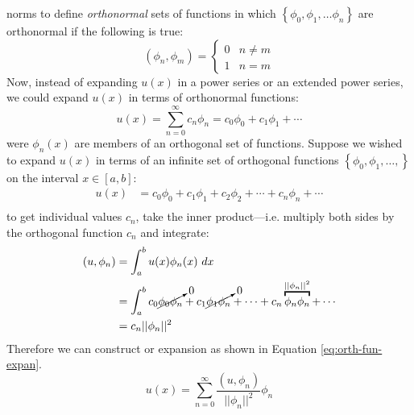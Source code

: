  norms to define \emph{orthonormal} sets of functions in which $\left\{ \phi_0, \phi_1, \dots \phi_n\right\}$ are orthonormal if the following is true:
\begin{equation*}
\left(\phi_n,\phi_m\right) = 
\begin{cases}
0 & n\ne m \\
1 & n=m
\end{cases}
\end{equation*}
Now, instead of expanding $u(x)$ in a power series or an extended power series, we could expand $u(x)$ in terms of orthonormal functions:
\begin{equation*}
u(x) = \sum\limits_{n=0}^{\infty} c_n \phi_n = c_0\phi_0 + c_1\phi_1 + \cdots
\end{equation*}
were $\phi_n(x)$ are members of an orthogonal set of functions. Suppose we wished to expand $u(x)$ in terms of an infinite set of orthogonal functions $\left\{\phi_0,\phi_1,\dots,\right\}$ on the interval $x\in[a,b]$:
\begin{align*}
u(x) &= c_0\phi_0 + c_1\phi_1 + c_2\phi_2 + \cdots + c_n\phi_n + \cdots \\
\end{align*}
to get individual values $c_n$, take the inner product---i.e. multiply both sides by the orthogonal function $c_n$ and integrate:
\begin{align*}
\left(u,\phi_n\right) &= \int_{a}^{b}u(x)\phi_n(x) \ dx \\
&= \int_{a}^{b} c_0 \cancelto{0}{\phi_0 \phi_n} + c_1\cancelto{0}{\phi_1 \phi_n} + \cdots + c_n\overbracket{\phi_n \phi_n}^{||\phi_n||^2} + \cdots \\
&= c_n||\phi_n||^2 
\end{align*}
Therefore we can construct or expansion as shown in Equation \ref{eq:orth-fun-expan}.
\begin{equation}
u(x) = \sum\limits_{n=0}^{\infty}\frac{\left(u,\phi_n\right)}{||\phi_n||^2}\phi_n
\label{eq:orth-fun-expan}
\end{equation}

